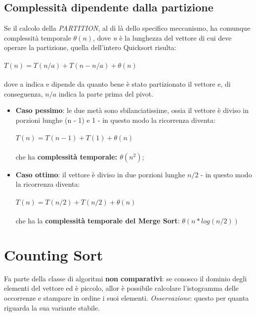 \documentclass{article}
\begin{document}
        \subsection{Complessità dipendente dalla partizione}
            Se il calcolo della \emph{PARTITION}, al di là dello specifico meccanismo, ha comunque complessità temporale $\theta(n)$, dove \emph{n} è la lunghezza del vettore di cui deve operare la partizione, quella dell'intero Quicksort risulta:\\
            \\
            $T(n) = T(n/a) + T(n - n/a) + \theta(n)$ \\
            \\
            dove a indica e dipende da quanto bene è stato partizionato il vettore e, di conseguenza, $n/a$ indica la parte prima del pivot.\\
            \newpage
            \begin{itemize}
                \item \textbf{Caso pessimo}: le due metà sono sbilanciatissime, ossia il vettore è diviso in porzioni lunghe (n - 1) e 1 - in questo modo la ricorrenza diventa:\\
                \\
                $T(n) = T(n -1) + T(1) + \theta(n)$ \\
                \\
                che ha \textbf{complessità temporale: $\theta(n^2)$};
                \item \textbf{Caso ottimo}:  il vettore è diviso in due porzioni lunghe $n/2$ - in questo modo la ricorrenza diventa:\\
                \\
                $T(n) = T(n/2) + T(n/2) + \theta(n)$ \\
                \\
                che ha la \textbf{complessità temporale del Merge Sort}: $\theta(n*log(n/2))$ 
            \end{itemize}
        \section{Counting Sort}
        Fa parte della classe di algoritmi \textbf{non comparativi}: se conosco il dominio degli elementi del vettore ed è piccolo, allor è possibile calcolare l'istogramma delle occorrenze e stampare in ordine i suoi elementi.
        \emph{Osservazione}: questo per quanta riguarda la sua variante stabile.\\
        \\
\end{document}
